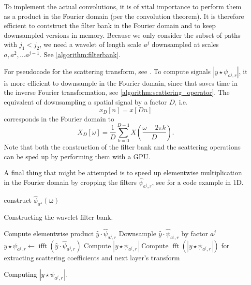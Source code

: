 \documentclass[twocolumn, openany, oneside, article]{memoir}
\DeclareMathOperator{\ifft}{ifft}
\DeclareMathOperator{\fft}{fft}
\begin{document}
To implement the actual convolutions, it is of vital importance to perform them
as a product in the Fourier domain (per the convolution theorem). It is therefore efficient to contstruct
the filter bank in the Fourier domain and to keep downsampled versions in memory. Because we only
consider the subset of paths with $j_1 < j_2$, we need a wavelet of length scale $a^j$ downsampled at
scales $a, a^{2}, \dots a^{j-1}$. See \autoref{algorithm:filterbank}.

For pseudocode for the scattering transform, see \cite{bruna2013invariant}.
To compute signals $|y \star \psi_{a^j, r}|$, it is more efficient to downsample in the Fourier domain,
since that saves time in the inverse Fourier transformation, see \autoref{algorithm:scattering_operator}.
The equivalent of downsampling a spatial signal by a factor $D$, i.e.
\begin{equation}
  x_D[n] = x[Dn]
\end{equation}
corresponds in the Fourier domain to
\begin{equation}
  X_D[\omega] = \frac{1}{D}\sum_{k=0}^{D-1}X(\frac{\omega - 2 \pi k}{D}).
\end{equation}
Note that both the construction of the filter bank and the scattering operations can be sped up
by performing them with a GPU.

A final thing that might be attempted is to speed up elementwise multiplication
in the Fourier domain by cropping the filters $\hat{\psi}_{a^j, r}$, see \cite{ifftmultiply}
for a code example in 1D.

\begin{algorithm}
construct $\hat{\phi}_{a^J}(\bm{\omega})$\;
\caption{Constructing the wavelet filter bank.}\label{algorithm:filterbank}
\end{algorithm}

\begin{algorithm}
  Compute elementwise product $\hat{y} \cdot \hat{\psi}_{a^j, r}$\;
  Downsample $\hat{y} \cdot \hat{\psi}_{a^j, r}$ by factor $a^j$\;
  $y \star \psi_{a^j, r} \leftarrow \ifft(\hat{y} \cdot \hat{\psi}_{a^j, r})$\;
  Compute $|y \star \psi_{a^j, r}|$\;
  Compute $\fft(|y \star \psi_{a^j, r}|)$ for extracting scattering coefficients and next layer's transform\;
  \caption{Computing $|y \star \psi_{a^j, r}|$.}\label{algorithm:scattering_operator}
\end{algorithm}






\printbibliography
\end{document}

